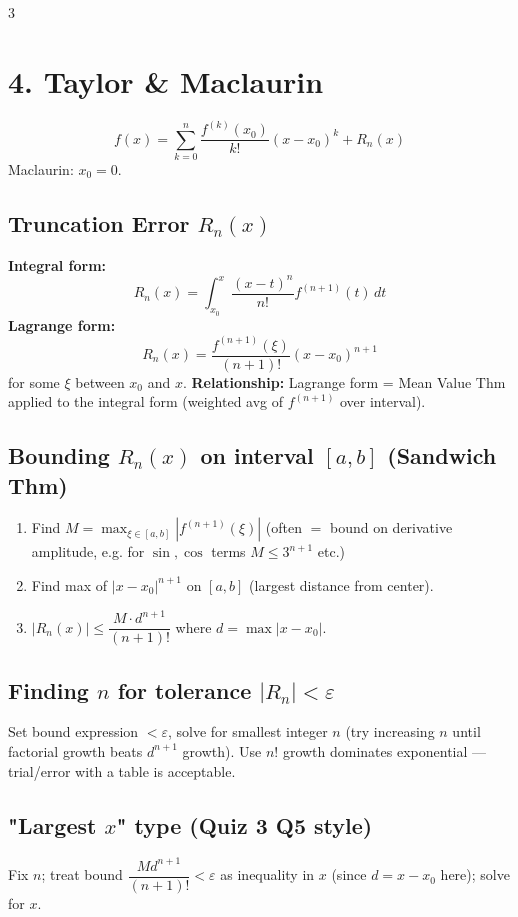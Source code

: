 \documentclass[9pt]{extarticle}
\newcommand{\hl}[1]{\textbf{\textcolor{BrickRed}{#1}}}
\begin{document}
\begin{multicols}{3}
\section{4. Taylor \& Maclaurin}
\begin{equation*}
f(x)=\sum_{k=0}^n \frac{f^{(k)}(x_0)}{k!}(x-x_0)^k + R_n(x)
\end{equation*}
Maclaurin: $x_0=0$.

\subsection{Truncation Error $R_n(x)$}
\textbf{Integral form:}
\begin{equation*}
R_n(x)=\int_{x_0}^x \frac{(x-t)^n}{n!}f^{(n+1)}(t)\,dt
\end{equation*}
\textbf{Lagrange form:}
\begin{equation*}
R_n(x)=\frac{f^{(n+1)}(\xi)}{(n+1)!}(x-x_0)^{n+1}
\end{equation*}
for some $\xi$ between $x_0$ and $x$.
\hl{Relationship:} Lagrange form = Mean Value Thm applied to the integral form (weighted avg of $f^{(n+1)}$ over interval).

\subsection{Bounding $R_n(x)$ on interval $[a,b]$ (Sandwich Thm)}
\begin{enumerate}
\item Find $M=\max_{\xi\in[a,b]}|f^{(n+1)}(\xi)|$ (often $=$ bound on derivative amplitude, e.g. for $\sin,\cos$ terms $M\le 3^{n+1}$ etc.)
\item Find max of $|x-x_0|^{n+1}$ on $[a,b]$ (largest distance from center).
\item $|R_n(x)|\le \dfrac{M\cdot d^{n+1}}{(n+1)!}$ where $d=\max|x-x_0|$.
\end{enumerate}

\subsection{Finding $n$ for tolerance $|R_n|<\varepsilon$}
Set bound expression $<\varepsilon$, solve for smallest integer $n$ (try increasing $n$ until factorial growth beats $d^{n+1}$ growth). Use $n!$ growth dominates exponential — trial/error with a table is acceptable.

\subsection{"Largest $x$" type (Quiz 3 Q5 style)}
Fix $n$; treat bound $\dfrac{M d^{n+1}}{(n+1)!}<\varepsilon$ as inequality in $x$ (since $d=x-x_0$ here); solve for $x$.


\end{multicols}
\end{document}
